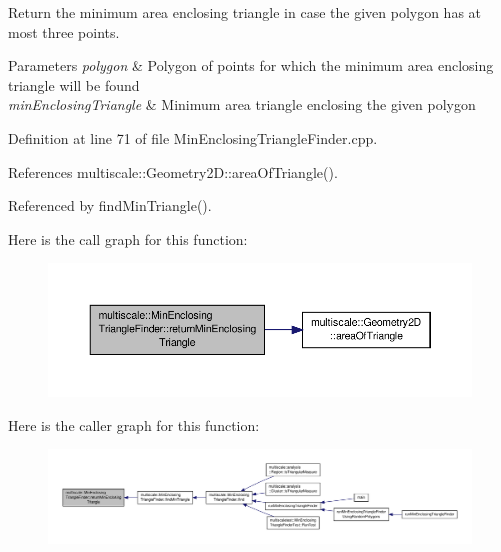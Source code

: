 Return the minimum area enclosing triangle in case the given polygon has at most three points. 


\begin{DoxyParams}{Parameters}
{\em polygon} & Polygon of points for which the minimum area enclosing triangle will be found \\
\hline
{\em min\-Enclosing\-Triangle} & Minimum area triangle enclosing the given polygon \\
\hline
\end{DoxyParams}


Definition at line 71 of file Min\-Enclosing\-Triangle\-Finder.\-cpp.



References multiscale\-::\-Geometry2\-D\-::area\-Of\-Triangle().



Referenced by find\-Min\-Triangle().



Here is the call graph for this function\-:\nopagebreak
\begin{figure}[H]
\begin{center}
\leavevmode
\includegraphics[width=350pt]{classmultiscale_1_1MinEnclosingTriangleFinder_af6e49a1ef5a0d4dbe3e25c2f92d69dc3_cgraph}
\end{center}
\end{figure}




Here is the caller graph for this function\-:\nopagebreak
\begin{figure}[H]
\begin{center}
\leavevmode
\includegraphics[width=350pt]{classmultiscale_1_1MinEnclosingTriangleFinder_af6e49a1ef5a0d4dbe3e25c2f92d69dc3_icgraph}
\end{center}
\end{figure}


